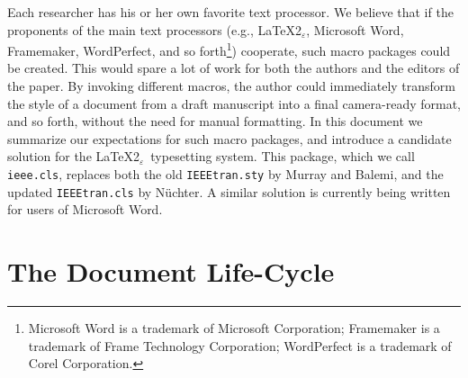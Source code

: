 \documentclass[%
	final,
	reprint,
	notitlepage,
	narroweqnarray,
	inline,
	twoside,
        invited,
	]{ieee}
\newcommand{\latexiie}{\LaTeX2{\Large$_\varepsilon$}}
\begin{document}
Each researcher has his or her own favorite text processor. We believe
that if the proponents of the main text processors (e.g., \latexiie,
Microsoft Word, Framemaker, WordPerfect, and so
forth\footnote{Microsoft Word is a trademark of Microsoft Corporation;
Frame\-maker is a trademark of Frame Technology Corporation;
WordPerfect is a trademark of Corel Corporation.}) cooperate, such
macro packages could be created. This would spare a lot of work for
both the authors and the editors of the paper.  By invoking different
macros, the author could immediately transform the style of a document
from a draft manuscript into a final camera-ready format, and so
forth, without the need for manual formatting.  In this document we
summarize our expectations for such macro packages, and introduce a
candidate solution for the \latexiie\ typesetting system. This
package, which we call \texttt{ieee.cls}, replaces both the old
\texttt{IEEEtran.sty} by Murray and Balemi, and the updated
\texttt{IEEEtran.cls} by N\"{u}chter. A similar solution is currently
being written for users of Microsoft Word.

\section{The Document Life-Cycle}
\end{document}
